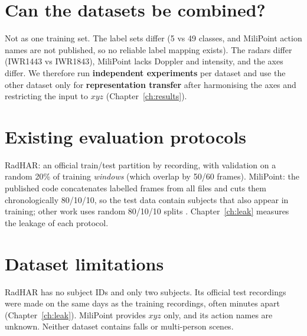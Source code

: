 \section{Can the datasets be combined?}
Not as one training set. The label sets differ (5 vs 49 classes, and MiliPoint
action names are not published, so no reliable label mapping exists). The radars
differ (IWR1443 vs IWR1843), MiliPoint lacks Doppler and intensity, and the axes
differ. We therefore run \textbf{independent experiments} per dataset and use the
other dataset only for \textbf{representation transfer} after harmonising the
axes and restricting the input to $xyz$ (Chapter~\ref{ch:results}).

\section{Existing evaluation protocols}
RadHAR: an official train/test partition by recording, with validation on a
random 20\% of training \emph{windows} (which overlap by 50/60 frames).
MiliPoint: the published code concatenates labelled frames from all files and
cuts them chronologically 80/10/10, so the test data contain subjects that also
appear in training; other work uses random 80/10/10 splits \cite{zakka2025makgcn}.
Chapter~\ref{ch:leak} measures the leakage of each protocol.

\section{Dataset limitations}
RadHAR has no subject IDs and only two subjects. Its official test recordings were
made on the same days as the training recordings, often minutes apart
(Chapter~\ref{ch:leak}). MiliPoint provides $xyz$ only, and its action names are
unknown. Neither dataset contains falls or multi-person scenes.
